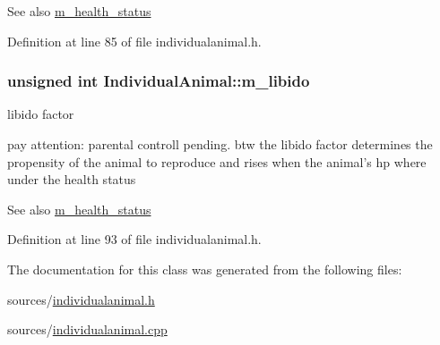 \begin{DoxySeeAlso}{See also}
\hyperlink{classSpecied_a7d716a70352c40bbe1ff3bd8c5719f29}{m\_\-health\_\-status} 
\end{DoxySeeAlso}


Definition at line 85 of file individualanimal.h.

\hypertarget{classIndividualAnimal_a60d160394b92b61685a63f3c91164938}{
\subsubsection[{m\_\-libido}]{\setlength{\rightskip}{0pt plus 5cm}unsigned int {\bf IndividualAnimal::m\_\-libido}}}
\label{classIndividualAnimal_a60d160394b92b61685a63f3c91164938}


libido factor 

pay attention: parental controll pending. btw the libido factor determines the propensity of the animal to reproduce and rises when the animal's hp where under the health status \begin{DoxySeeAlso}{See also}
\hyperlink{classSpecied_a7d716a70352c40bbe1ff3bd8c5719f29}{m\_\-health\_\-status} 
\end{DoxySeeAlso}


Definition at line 93 of file individualanimal.h.



The documentation for this class was generated from the following files:\begin{DoxyCompactItemize}
\item 
sources/\hyperlink{individualanimal_8h}{individualanimal.h}\item 
sources/\hyperlink{individualanimal_8cpp}{individualanimal.cpp}\end{DoxyCompactItemize}
